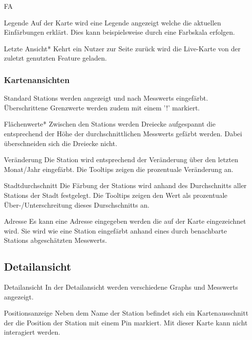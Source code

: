 \begin{Kriterien}{FA}
 \item[Legende]
  Auf der Karte wird eine Legende angezeigt welche die aktuellen Einfärbungen erklärt.
  Dies kann beispielsweise durch eine Farbskala erfolgen.

 \item[Letzte Ansicht*]
  Kehrt ein Nutzer zur Seite zurück wird die \gls{Live-Karte} von der zuletzt genutzten \gls{Feature} geladen.

 \subsubsection*{Kartenansichten}

 \item[Standard]
  \glspl{Station} werden angezeigt und nach \glspl{Messwert} eingefärbt. 
  Überschrittene Grenzwerte werden zudem mit einem '!' markiert.

 \item[Flächenwerte*]
   Zwischen den \glspl{Station} werden Dreiecke aufgespannt die entsprechend der Höhe der durchschnittlichen \glspl{Messwert} gefärbt werden.
   Dabei überschneiden sich die Dreiecke nicht.

 \item[Veränderung]
   Die \gls{Station} wird entsprechend der Veränderung über den letzten Monat/Jahr eingefärbt.
   Die \glspl{Tooltip} zeigen die prozentuale Veränderung an.

 \item[Stadtdurchschnitt]
  Die Färbung der \glspl{Station} wird anhand des Durchschnitts aller \glspl{Station} der Stadt festgelegt.
  Die \glspl{Tooltip} zeigen den Wert als prozentuale Über-/Unterschreitung dieses Durschschnitts an. 

 \item[Adresse]
   Es kann eine Adresse eingegeben werden die auf der Karte eingezeichnet wird.
   Sie wird wie eine \gls{Station} eingefärbt anhand eines durch benachbarte \glspl{Station} abgeschätzten \gls{Messwert}s.

\subsection{Detailansicht}

 \item[Detailansicht]
   In der Detailansicht werden verschiedene \glspl{Graph} und \glspl{Messwert} angezeigt. 

 \item[Positionsanzeige]
  Neben dem Name der \gls{Station} befindet sich ein Kartenausschnitt der die Position der \gls{Station} mit einem \gls{Pin} markiert.
  Mit dieser Karte kann nicht interagiert werden.


\end{Kriterien}
